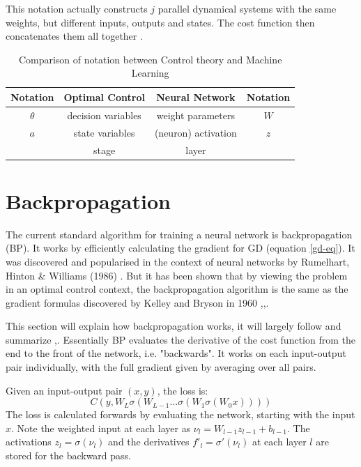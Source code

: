 This notation actually constructs $j$ parallel dynamical systems with the same weights, but different inputs, outputs and states. The cost function then concatenates them all together \cite{dreyfus1990}.

\begin{table}
\centering
\begin{tabular}{c | c | c | c}
Notation & Optimal Control & Neural Network & Notation\\ \hline
$\theta$ & decision variables & weight parameters & $W$\\
$a$ & state variables & (neuron) activation & $z$\\
& stage & layer \\
\end{tabular}
\caption{Comparison of notation between Control theory and Machine Learning}
\label{trans-tbl}
\end{table}


\section{Backpropagation}
The current standard algorithm for training a neural network is backpropagation (BP). It works by efficiently calculating the gradient for GD (equation \ref{gd-eq}). It was discovered and popularised in the context of neural networks by Rumelhart, Hinton \& Williams (1986) \cite{Rumelhart1986}. But it has been shown that by viewing the problem in an optimal control context, the backpropagation algorithm is the same as the gradient formulas discovered by Kelley and Bryson in 1960 \cite{dreyfus1990},\cite{kelley1960},\cite{Bryson1962}.

This section will explain how backpropagation works, it will largely follow and summarize \cite{Nielsen2015},\cite{wikiback}. Essentially BP evaluates the derivative of the cost function from the end to the front of the network, i.e. "backwards". It works on each input-output pair individually, with the full gradient given by averaging over all pairs.

Given an input-output pair $(x,y)$, the loss is:
\begin{equation}
C(y,W_L\sigma(W_{L-1}...\sigma(W_1\sigma(W_0x))))
\end{equation}
The loss is calculated forwards by evaluating the network, starting with the input $x$. Note the weighted input at each layer as $\nu_l = W_{l-1}z_{l-1} + b_{l-1}$. The activations $z_l = \sigma(\nu_l)$ and the derivatives $f'_l = \sigma'(\nu_l)$ at each layer $l$ are stored for the backward pass.

